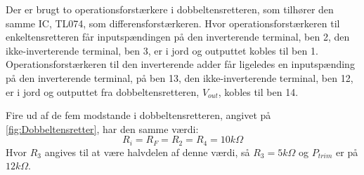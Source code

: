 %
Der er brugt to operationsforstærkere i dobbeltensretteren, som tilhører den samme IC, TL074, som differensforstærkeren. Hvor operationsforstærkeren til enkeltensretteren får inputspændingen på den inverterende terminal, ben 2, den ikke-inverterende terminal, ben 3, er i jord og outputtet kobles til ben 1. Operationsforstærkeren til den inverterende adder får ligeledes en inputspænding på den inverterende terminal, på ben 13, den ikke-inverterende terminal, ben 12, er i jord og outputtet fra dobbeltensretteren, $V_{out}$, kobles til ben 14.

Fire ud af de fem modstande i dobbeltensretteren, angivet på \autoref{fig:Dobbeltensretter}, har den samme værdi:
%
\begin{equation}
	R_i = R_F = R_2 = R_4 = 10k\Omega
\end{equation}
%
Hvor $R_3$ angives til at være halvdelen af denne værdi, så $R_3 = 5k\Omega$ og $P_{trim}$ er på $12k\Omega$.


